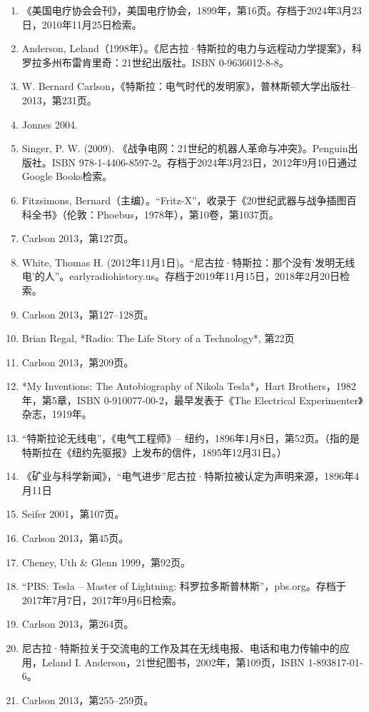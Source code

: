 \begin{enumerate}
\item 《美国电疗协会会刊》，美国电疗协会，1899年，第16页。存档于2024年3月23日，2010年11月25日检索。  
\item Anderson, Leland（1998年）。《尼古拉·特斯拉的电力与远程动力学提案》，科罗拉多州布雷肯里奇：21世纪出版社。ISBN 0-9636012-8-8。  
\item W. Bernard Carlson，《特斯拉：电气时代的发明家》，普林斯顿大学出版社– 2013，第231页。
\item Jonnes 2004.  
\item Singer, P. W. (2009). 《战争电网：21世纪的机器人革命与冲突》。Penguin出版社。ISBN 978-1-4406-8597-2。存档于2024年3月23日，2012年9月10日通过Google Books检索。  
\item Fitzsimons, Bernard（主编）。“Fritz-X”，收录于《20世纪武器与战争插图百科全书》（伦敦：Phoebus，1978年），第10卷，第1037页。  
\item Carlson 2013，第127页。
\item White, Thomas H. (2012年11月1日)。“尼古拉·特斯拉：那个没有‘发明无线电’的人”。earlyradiohistory.us。存档于2019年11月15日，2018年2月20日检索。  
\item Carlson 2013，第127–128页。
\item Brian Regal, *Radio: The Life Story of a Technology*, 第22页  
\item Carlson 2013，第209页。  
\item *My Inventions: The Autobiography of Nikola Tesla*，Hart Brothers，1982年，第5章，ISBN 0-910077-00-2，最早发表于《The Electrical Experimenter》杂志，1919年。  
\item “特斯拉论无线电”，《电气工程师》– 纽约，1896年1月8日，第52页。（指的是特斯拉在《纽约先驱报》上发布的信件，1895年12月31日。）  
\item 《矿业与科学新闻》，“电气进步”尼古拉·特斯拉被认定为声明来源，1896年4月11日  
\item Seifer 2001，第107页。  
\item Carlson 2013，第45页。  
\item Cheney, Uth & Glenn 1999，第92页。  
\item “PBS: Tesla – Master of Lightning: 科罗拉多斯普林斯”，pbs.org。存档于2017年7月7日，2017年9月6日检索。
\item Carlson 2013，第264页。  
\item 尼古拉·特斯拉关于交流电的工作及其在无线电报、电话和电力传输中的应用，Leland I. Anderson，21世纪图书，2002年，第109页，ISBN 1-893817-01-6。  
\item Carlson 2013，第255–259页。  

\end{enumerate}
